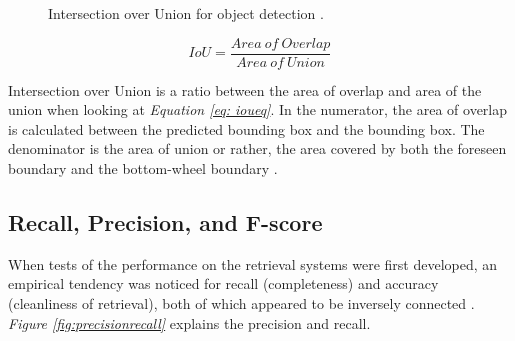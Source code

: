 \begin{figure}[h]
  \centering
  \hfill
  \caption{Intersection over Union for object detection \cite{rosebrock_intersection_2016}.}
  \label{figure: iou}
\end{figure}

\begin{equation}
  IoU = \frac{Area\ of\ Overlap}{Area\ of\ Union} \label{eq: ioueq}
\end{equation}
\vspace{0.5cm}

Intersection over Union is a ratio between the area of overlap and area of the union when looking at \textit{Equation \ref{eq: ioueq}}.
In the numerator, the area of overlap is calculated between the predicted bounding box and the bounding box.
The denominator is the area of union or rather, the area covered by both the foreseen boundary and the bottom-wheel boundary \cite{uavs_comparing_2019}.
\subsection{Recall, Precision, and F-score}
When tests of the performance on the retrieval systems were first developed, an empirical tendency was noticed for recall (completeness) and accuracy (cleanliness of retrieval), both of which appeared to be inversely connected \cite{buckland_relationship_1994}. \textit{Figure \ref{fig:precisionrecall}} explains the precision and recall.



